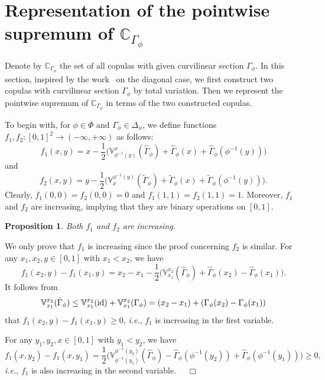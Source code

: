\documentclass[12pt]{article}
\renewenvironment{proof}{\noindent{\bf Proof.}}{~~$\Box$}
\theoremstyle{plain}
\newtheorem{prot}[thrm]{Proposition}
\theoremstyle{definition}
\begin{document}
\section{Representation of the pointwise supremum of $\mathbb{C}_{\Gamma_\phi}$}\label{Sec-Formula}

Denote by $\mathbb{C}_{\Gamma_\phi}$ the set of all copulas with given curvilinear section $\Gamma_\phi$.
In this section, inspired by the work~\cite{KMS24} on the diagonal case, we first construct two copulas with curvilinear section $\Gamma_\phi$ by total variation.
Then we represent the pointwise supremum of $\mathbb{C}_{\Gamma_\phi}$ in terms of the two constructed copulas.

To begin with, for $\phi\in\Phi$ and $\Gamma_\phi\in\Delta_\phi$, we define functions $f_1, f_2\colon [0, 1]^2\to (-\infty, +\infty)$ as follows:
\begin{equation*}
f_1(x, y)=x-\frac{1}{2}\Big(\mathbb{V}^{x}_{\phi^{-1}(y)}(\hat{\Gamma}_{\phi})+\hat{\Gamma}_{\phi}(x)+\hat{\Gamma}_{\phi}(\phi^{-1}(y)) \Big)
\end{equation*}
and
\begin{equation*}
f_2(x, y)=y-\frac{1}{2}\Big(\mathbb{V}^{\phi^{-1}(y)}_{x}(\tilde{\Gamma}_{\phi})+\tilde{\Gamma}_{\phi}(x)+ \tilde{\Gamma}_{\phi}(\phi^{-1}(y))\Big).
\end{equation*}
Clearly, $f_1(0, 0)=f_2(0, 0)=0$ and $f_1(1, 1)=f_2(1, 1)=1$. Moreover, $f_1$ and $f_2$ are increasing, implying that they are
binary operations on $[0, 1]$.

\begin{prot}\label{prot-agop}
Both $f_1$ and $f_2$ are increasing.
\end{prot}
\begin{proof}
We only prove that $f_1$ is increasing since the proof concerning $f_2$ is similar.
For any $x_1, x_2, y\in[0, 1]$ with $x_1<x_2$, we have
\[
f_1(x_2, y)-f_1(x_1, y)=x_2-x_1-\frac{1}{2}\Big(\mathbb{V}_{x_1}^{x_2}(\hat{\Gamma}_\phi)+\hat{\Gamma}_\phi(x_2)-\hat{\Gamma}_\phi(x_1)\Big).
\]
It follows from
\[
\mathbb{V}_{x_1}^{x_2}(\hat{\Gamma}_\phi)\leq\mathbb{V}_{x_1}^{x_2}({\rm id})+ \mathbb{V}_{x_1}^{x_2}(\Gamma_\phi)=(x_2-x_1)+(\Gamma_\phi(x_2)-\Gamma_\phi(x_1))
\]
that $f_1(x_2, y)-f_1(x_1, y)\geq 0$, \emph{i.e.}, $f_1$ is increasing in the first variable.

For any $y_1, y_2, x\in[0, 1]$ with $y_1<y_2$, we have
\[
f_1(x, y_2)-f_1(x, y_1)=\frac{1}{2}\Big(\mathbb{V}_{\phi^{-1}(y_1)}^{\phi^{-1}(y_2)}(\hat{\Gamma}_\phi)-\hat{\Gamma}_\phi(\phi^{-1}(y_2))+\hat{\Gamma}_\phi(\phi^{-1}(y_1))\Big)\geq 0,
\]
\emph{i.e.}, $f_1$ is also increasing in the second variable.
\end{proof}
\end{document}
